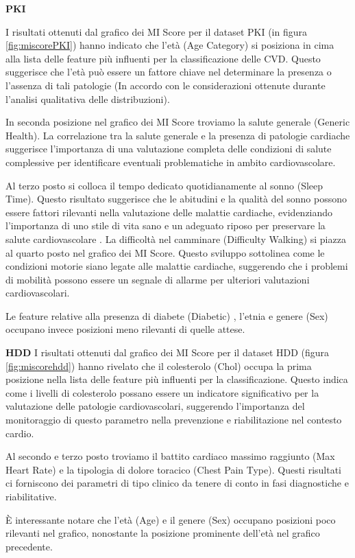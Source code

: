 \textbf{PKI}
\begin{flushleft}
    
I risultati ottenuti dal grafico dei MI Score per il dataset PKI (in figura \ref{fig:miscorePKI}) hanno indicato che l'età (Age Category) si posiziona in cima alla lista delle feature più influenti per la classificazione delle CVD. Questo suggerisce che l'età può essere un fattore chiave nel determinare la presenza o l'assenza di tali patologie (In accordo con le considerazioni ottenute durante l'analisi qualitativa delle distribuzioni).


In seconda posizione nel grafico dei MI Score troviamo la salute generale (Generic Health). 
La correlazione tra la salute generale e la presenza di patologie cardiache suggerisce l'importanza di una valutazione completa delle condizioni di salute complessive per identificare  eventuali problematiche in ambito cardiovascolare.

Al terzo posto si colloca il tempo dedicato quotidianamente al sonno (Sleep Time). Questo risultato suggerisce che le abitudini e la qualità del sonno possono essere fattori rilevanti nella valutazione delle malattie cardiache, evidenziando l'importanza di uno stile di vita sano e un adeguato riposo per preservare la salute cardiovascolare \cite{sonnocvd}.
La difficoltà nel camminare (Difficulty Walking) si piazza al quarto posto nel grafico dei MI Score. Questo sviluppo sottolinea come le condizioni motorie siano legate alle malattie cardiache, suggerendo che i problemi di mobilità possono essere un segnale di allarme per ulteriori valutazioni cardiovascolari.

Le feature relative alla presenza di diabete (Diabetic) , l'etnia e genere (Sex) occupano invece posizioni meno rilevanti di quelle attese.
\newline


\textbf{HDD}
\newline
I risultati ottenuti dal grafico dei MI Score per il dataset HDD (figura \ref{fig:miscorehdd}) hanno rivelato che il colesterolo (Chol) occupa la prima posizione nella lista delle feature più influenti per la classificazione. Questo indica come i livelli di colesterolo possano essere un indicatore significativo per la valutazione delle patologie cardiovascolari, suggerendo l'importanza del monitoraggio di questo parametro nella prevenzione e riabilitazione nel contesto cardio.

Al secondo e terzo posto troviamo il battito cardiaco massimo raggiunto (Max Heart Rate) e la tipologia di dolore toracico (Chest Pain Type). Questi risultati ci forniscono dei parametri di tipo clinico da tenere di conto in fasi diagnostiche e riabilitative.

È interessante notare che l'età (Age) e il genere (Sex) occupano posizioni poco rilevanti nel grafico, nonostante la posizione prominente dell'età nel grafico precedente. 



\end{flushleft}





